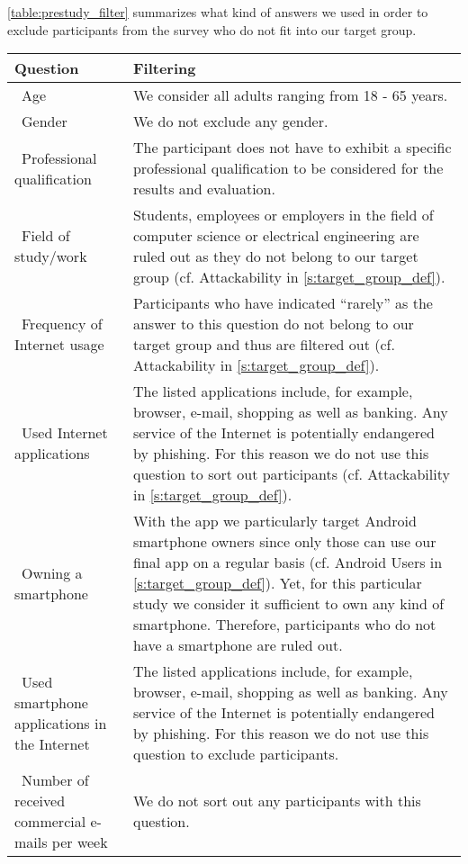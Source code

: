 \autoref{table:prestudy_filter} summarizes what kind of answers we used in order to exclude participants from the survey who do not fit into our target group.
\begin{table}[hHtbp]
\centering
    \begin{tabular}{ | p{4.5cm} | p{10cm} |}
    \hline\textbf{Question} & \textbf{Filtering}  \\  \hline
		\hline\  Age & We consider all adults ranging from 18 - 65 years.
 \\
    \hline\  Gender & We do not exclude any gender.
 \\ 
    \hline\  Professional qualification & The participant does not have to exhibit a specific professional qualification to be considered for the results and evaluation.
 \\ 
		\hline\  Field of study/work & Students, employees or employers in the field of computer science or electrical engineering are ruled out as they do not belong to our target group (cf. Attackability in \autoref{s:target_group_def}).
 \\ 
	  \hline\ Frequency of Internet usage & Participants who have indicated ``rarely'' as the answer to this question do not belong to our target group and thus are filtered out (cf. Attackability in \autoref{s:target_group_def}).
 \\ 
	  \hline\ Used Internet applications  &  The listed applications include, for example, browser, e-mail, shopping as well as banking.
 Any service of the Internet is potentially endangered by phishing.
 For this reason we do not use this question to sort out participants (cf. Attackability in \autoref{s:target_group_def}).
\\ 
    \hline\ Owning a smartphone  & With the app we particularly target Android smartphone owners since only those can use our final app on a regular basis (cf. Android Users in \autoref{s:target_group_def}).
 Yet, for this particular study we consider it sufficient to own any kind of smartphone.
Therefore, participants who do not have a smartphone are ruled out.
 \\
		\hline\ Used smartphone applications in the Internet  & The listed applications include, for example, browser, e-mail, shopping as well as banking.
 Any service of the Internet is potentially endangered by phishing.
 For this reason we do not use this question to exclude participants.
 \\
    \hline\ Number of received commercial e-mails per week  & We do not sort out any participants with this question.

\end{tabular}
\end{table}
